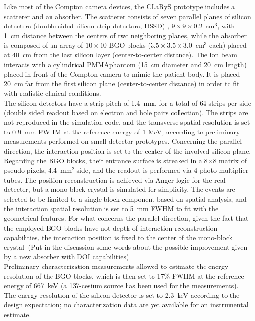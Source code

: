 Like most of the Compton camera devices, the CLaRyS prototype includes a scatterer and an absorber. The scatterer consists of seven parallel planes of silicon detectors (double-sided silicon strip detectors, DSSD) , $9\times9\times0.2$~cm$^3$, with 1~cm distance between the centers of two neighboring planes, while the absorber is composed of an array of $10\times10$ BGO blocks ($3.5\times3.5\times3.0$~cm$^3$ each) placed at 40~cm from the last silicon layer (center-to-center distance). The ion beam interacts with a cylindrical PMMA\footnotemark[1] phantom (15~cm diameter and 20~cm length) placed in front of the Compton camera to mimic the patient body. It is placed 20~cm far from the first silicon plane (center-to-center distance) in order to fit with realistic clinical conditions.\\
The silicon detectors have a strip pitch of 1.4~mm, for a total of 64 strips per side (double sided readout based on electron and hole pairs collection). The strips are not reproduced in the simulation code, and the transverse spatial resolution is set to 0.9~mm FWHM at the reference energy of 1 MeV, according to preliminary measurements performed on small detector prototypes. Concerning the parallel direction, the interaction position is set to the center of the involved silicon plane.\\
Regarding the BGO blocks, their entrance surface is streaked in a 8$\times$8 matrix of pseudo-pixels, 4.4~mm$^{2}$ side, and the readout is performed via 4 photo multiplier tubes. The position reconstruction is achieved via Anger logic for the real detector, but a mono-block crystal is simulated for simplicity. The events are selected to be limited to a single block component based on spatial analysis, and the interaction spatial resolution is set to 5~mm FWHM to fit with the geometrical features. For what concerns the parallel direction, given the fact that the employed BGO blocks have not depth of interaction reconstruction capabilities, the interaction position is fixed to the center of the mono-block crystal. (Put in the discussion some words about the possible improvement given by a new absorber with DOI capabilities)\\
Preliminary characterization measurements allowed to estimate the energy resolution of the BGO blocks, which is then set to 17\% FWHM at the reference energy of 667~keV (a 137-cesium source has been used for the measurements). The energy resolution of the silicon detector is set to 2.3~keV according to the design expectation; no characterization data are yet available for an instrumental estimate.\\
